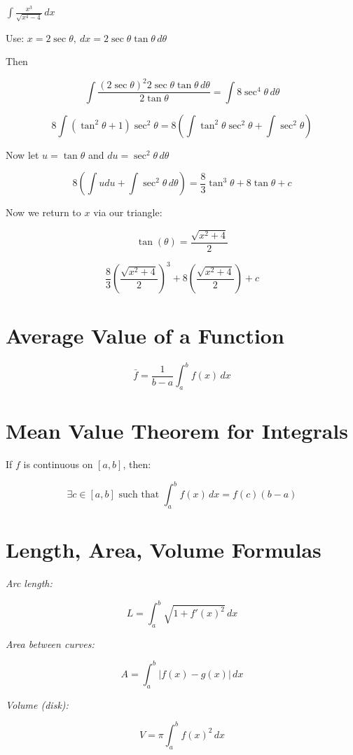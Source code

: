 \( \int \frac{x^3}{\sqrt{x^4 - 4}} \,dx \)

Use: \(x = 2\sec \theta, \ dx = 2\sec \theta \tan \theta \,d\theta \)

Then

\[
    \int \frac{{(2\sec\theta)}^2 2\sec\theta \tan\theta \,d\theta}{2\tan\theta} = \int 8\sec^4 \theta\,d\theta
\]

\[
    8\int(\tan^2\theta + 1)\sec^2\theta = 8\left(\int\tan^2\theta\sec^2\theta + \int \sec^2\theta \right)
\]

Now let \(u = \tan\theta\) and \(du = \sec^2\theta \,d\theta\)

\[
    8\left( \int udu  + \int \sec^2\theta\,d\theta\right) = 
    \frac{8}{3}\tan^3\theta + 8\tan\theta + c
\]

Now we return to \(x\) via our triangle:

\[
    \tan(\theta) = \frac{\sqrt{x^2 + 4}}{2}
\]

\[
    \frac{8}{3}{\left(\frac{\sqrt{x^2 + 4}}{2}\right)}^3 + 8 \left(\frac{\sqrt{x^2 + 4}}{2}\right) + c
\]

\section{Average Value of a Function}

\[
    \bar{f} = \frac{1}{b - a} \int_a^b f(x)\,dx
\]

\section{Mean Value Theorem for Integrals}

If \(f\) is continuous on \([a, b]\), then:

\[
    \exists c \in [a, b] \text{ such that } \int_a^b f(x)\,dx = f(c)(b - a)
\]

\section{Length, Area, Volume Formulas}

\emph{Arc length:}

\[
    L = \int_a^b \sqrt{1 + {f'(x)}^2}\,dx
\]

\emph{Area between curves:}

\[
    A = \int_a^b |f(x) - g(x)|\,dx
\]

\emph{Volume (disk):}

\[
    V = \pi \int_a^b {f(x)}^2\,dx
\]

